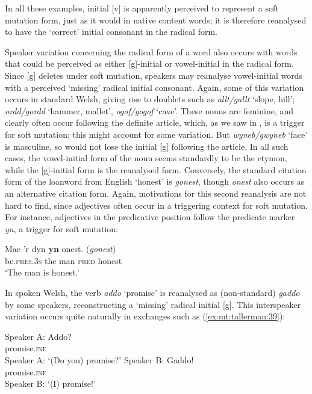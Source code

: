 \documentclass[output=paper,colorlinks,citecolor=brown]{langscibook}
\begin{document}
\noindent In all these examples, initial [v] is apparently perceived to represent a soft mutation form, just as it would in native content words; it is therefore reanalysed to have the ‘correct’ initial consonant in the radical form. 

{Speaker variation concerning the radical form of a word also occurs with words that could be perceived as either [g]-initial or vowel-initial in the radical form. Since [g] deletes under soft mutation, speakers may reanalyse vowel-initial words with a perceived ‘missing’ radical initial consonant. Again, some of this variation occurs in standard Welsh, giving rise to doublets such as} {\textit{allt/gallt}}{ ‘slope, hill’;} {\textit{ordd/gordd} }{‘hammer, mallet’,} {\textit{ogof/gogof}}{ ‘cave’. These nouns are feminine, and clearly often occur following the definite article, which, as we saw in , is a trigger for soft mutation; this might account for some variation. But} {\textit{wyneb/gwyneb}}{ ‘face’ is masculine, so would not lose the initial [g] following the article. In all such cases, the vowel-initial form of the noun seems standardly to be the etymon, while the [g]-initial form is the reanalysed form. Conversely, the standard citation form of the loanword from English ‘honest’ is} {\textit{gonest}}{, though} {\textit{onest} }{also occurs as an alternative citation form. Again, motivations for this second reanalysis are not hard to find, since adjectives often occur in a triggering context for soft mutation. For instance, adjectives in the predicative position follow the predicate marker} {\textit{yn}}{, a trigger for soft mutation:} 

\ea\label{ex:mt:tallerman:38}
\gll Mae ’r dyn \textbf{yn} onest.     (\textit{gonest}) \\
be.\textsc{pres.3s} the man \textsc{pred} honest\\
\glt ‘The man is honest.’
\z

In spoken Welsh, the verb {\textit{addo}} ‘promise’ is reanalysed as (non-standard) \textit{gaddo} by some speakers, reconstructing a ‘missing’ radical initial [g]. This interspeaker variation occurs quite naturally in exchanges such as (\ref{ex:mt:tallerman:39}):

\ea\label{ex:mt:tallerman:39}
\ea
\gll Speaker A:   Addo? \\
{} {} promise.{\textsc{inf}}\\
\glt Speaker A: ‘(Do you) promise?’
\ex
\gll Speaker B:   Gaddo!\\
{} {} promise.{\textsc{inf}}\\
\glt Speaker B: ‘(I) promise!’    
\z
\z
\end{document}
